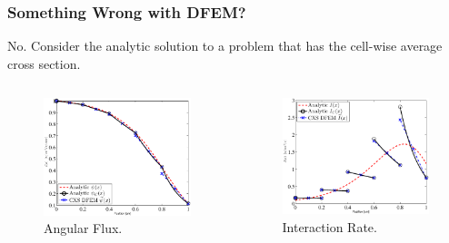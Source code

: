 \documentclass{beamer}
\begin{document}
\begin{frame}
\frametitle{Something Wrong with DFEM?}
No.  Consider the analytic solution to a problem that has the cell-wise average cross section.
\begin{columns}[c]
\begin{figure}
\includegraphics[width=5cm]{Psi_Blades.eps}
\caption{Angular Flux.}
\end{figure}
\begin{figure}
\includegraphics[width=5cm]{I_Blades.eps}
\caption{Interaction Rate.}
\end{figure}
\end{columns}

\end{frame}
\end{document}
